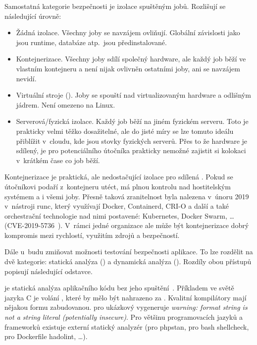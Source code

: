         Samostatná kategorie bezpečnosti \CI je izolace spuštěným jobů. Rozlišují se následující úrovně:
        \begin{itemize}
            \item Žádná izolace. Všechny joby se navzájem ovliňují. Globální závislosti jako jsou runtime, databáze atp.~jsou předinstalované.
            \item Kontejnerizace. Všechny joby sdílí společný hardware, ale každý job běží ve vlastním kontejneru a není nijak ovlivněn ostatními joby, ani se navzájem nevidí.
            \item Virtuální stroje (). Joby se spouští nad virtualizovaným hardware a odlišným jádrem. Není omezeno na Linux.
            \item Serverová/fyzická izolace. Každý job běží na jiném fyzickém serveru. Toto je prakticky velmi těžko dosažitelné, ale do jisté míry se lze tomuto ideálu přiblížit v~cloudu, kde jsou stovky fyzických serverů. Přes to že hardware je sdílený, je pro potenciálního útočníka prakticky nemožné zajistit si kolokaci v~krátkém čase co job běží.
        \end{itemize}

        Kontejnerizace je praktická, ale nedostačující izolace pro sdílená \CI. Pokud se útočníkovi podaří z~kontejneru utéct, má plnou kontrolu nad hostitelským systémem a i všemi joby. Přesně taková zranitelnost byla nalezena v~únoru 2019 v~nástroji runc, který využívají Docker, Containerd, CRI-O a další a také orchestrační technologie nad nimi postavené: Kubernetes, Docker Swarm, … (CVE-2019-5736~\cite{CVE-2019-5736}). V~rámci jedné organizace ale může být kontejnerizace dobrý kompromis mezi rychlostí, využitím zdrojů a bezpečností.

        Dále u~\CI budu zmiňovat možnosti testování bezpečnosti aplikace. To lze rozdělit na dvě kategorie: statická analýza () a dynamická analýza (). Rozdíly obou přístupů popisují následující odstavce.

        \label{sast-dast}
         je statická analýza aplikačního kódu bez jeho spuštění~\cite{sast}. Příkladem ve světě jazyka C je volání , které by mělo být nahrazeno za . Kvalitní kompilátory mají nějakou formu  zabudovanou.  pro ukázkový  vygeneruje \textit{warning: format string is not a string literal (potentially insecure)}. Pro většinu programovacích jazyků a frameworků existuje externí statický analyzér (pro  phpstan, pro bash shellcheck, pro Dockerfile hadolint, …).

